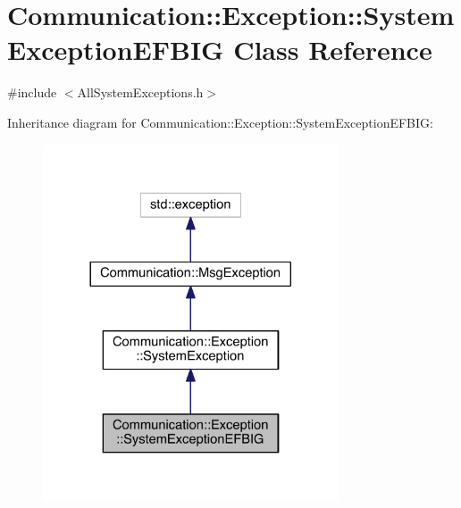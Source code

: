 \hypertarget{class_communication_1_1_exception_1_1_system_exception_e_f_b_i_g}{}\section{Communication\+:\+:Exception\+:\+:System\+Exception\+E\+F\+B\+I\+G Class Reference}
\label{class_communication_1_1_exception_1_1_system_exception_e_f_b_i_g}


{\ttfamily \#include $<$All\+System\+Exceptions.\+h$>$}



Inheritance diagram for Communication\+:\+:Exception\+:\+:System\+Exception\+E\+F\+B\+I\+G\+:\nopagebreak
\begin{figure}[H]
\begin{center}
\leavevmode
\includegraphics[width=248pt]{class_communication_1_1_exception_1_1_system_exception_e_f_b_i_g__inherit__graph}
\end{center}
\end{figure}



